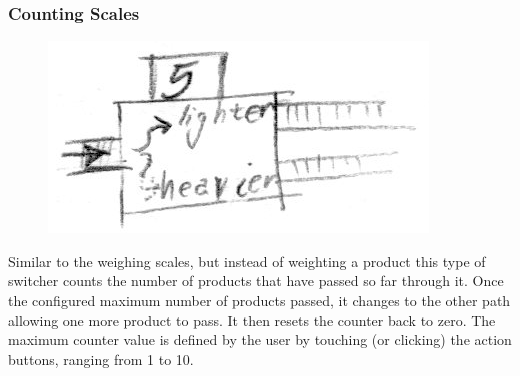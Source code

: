 \documentclass[a4paper]{scrartcl}
\begin{document}
		\subsubsection{Counting Scales}
            \begin{minipage}[t][8em][t]{\textwidth}
                \begin{figure}
                    \vspace{-20pt}
                    \includegraphics[scale=1]{devices/scale}
                    \vspace{-20pt}
                \end{figure}

                Similar to the weighing scales, but instead of weighting a product this type of switcher counts the number of products that have passed so far through it. Once the configured maximum number of products passed, it changes to the other path allowing one more product to pass. It then resets the counter back to zero. The maximum counter value is defined by the user by touching (or clicking) the action buttons, ranging from 1 to 10.
            \end{minipage}            
\end{document}
